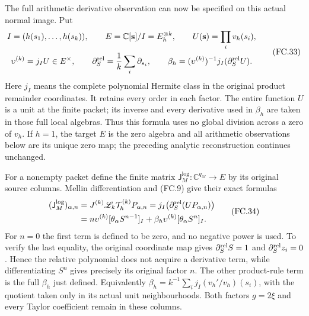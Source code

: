 The full arithmetic derivative observation can now be specified on
this actual normal image. Put
\[
 \begin{gathered}
 I=(h(s_1),\ldots,h(s_k)),\qquad
 E=\mathbb C[\mathbf s]/I=E_h^{\otimes k},\qquad
 U(\mathbf s)=\prod_i v_h(s_i),\\
 \upsilon^{(k)}=j_IU\in E^\times,\qquad
 \partial_S^{\rm rel}=\frac1k\sum_i\partial_{s_i},\qquad
 \beta_h=(\upsilon^{(k)})^{-1}j_I(\partial_S^{\rm rel}U).
 \end{gathered}
 \tag{FC.33}
\]
Here \(j_I\) means the complete polynomial Hermite class in the
original product remainder coordinates. It retains every order in
each factor. The entire function \(U\) is a unit at the finite
packet; its inverse and every derivative used in \(\beta_h\)
are taken in those full local algebras. Thus this formula uses no
global division across a zero of \(v_h\). If \(h=1\), the
target \(E\) is the zero algebra and all arithmetic observations
below are its unique zero map; the preceding analytic reconstruction
continues unchanged.

For a nonempty packet define the finite matrix
\(\mathsf J_M^{\log}:\mathbb C^{q_M}\to E\) by its original
source columns. Mellin differentiation and (FC.9) give their exact
formulas
\[
 \begin{aligned}
 (\mathsf J_M^{\log})_{\alpha,n}
 &=J^{(k)}\mathscr L_k\mathcal T_h^{(k)}P_{\alpha,n}
   =j_I\bigl(\partial_S^{\rm rel}(UP_{\alpha,n})\bigr)\\
 &=n\upsilon^{(k)}[\theta_\alpha S^{n-1}]_I
       +\beta_h\upsilon^{(k)}[\theta_\alpha S^n]_I.
 \end{aligned}
 \tag{FC.34}
\]
For \(n=0\) the first term is defined to be zero, and no negative
power is used. To verify the last equality, the original coordinate
map gives \(\partial_S^{\rm rel}S=1\) and
\(\partial_S^{\rm rel}z_i=0\). Hence the relative polynomial
does not acquire a derivative term, while differentiating \(S^n\)
gives precisely its original factor \(n\). The other product-rule
term is the full \(\beta_h\) just defined. Equivalently
\(\beta_h=k^{-1}\sum_i j_I(v_h'/v_h)(s_i)\), with the
quotient taken only in its actual unit neighbourhoods. Both factors
\(g=2\xi\) and every Taylor coefficient remain in these columns.


